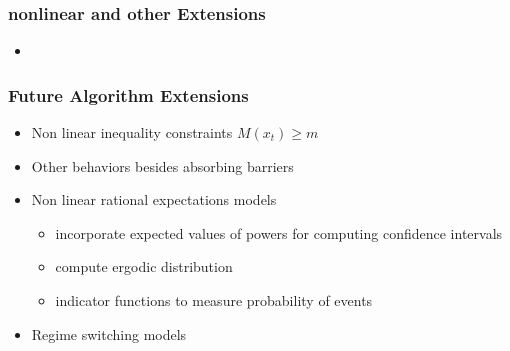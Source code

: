 \documentclass{beamer}
\begin{document}
  \begin{frame}
    \frametitle{nonlinear and other Extensions}
    \begin{itemize}
    \item 
    \end{itemize}
  \end{frame}

   \begin{frame}
     \frametitle{Future Algorithm Extensions}
     \begin{itemize}
     \item  Non linear inequality constraints $M(x_t) \ge m $
     \item Other behaviors besides absorbing barriers
\item Non linear rational expectations models
  \begin{itemize}
\item incorporate expected values of powers for computing confidence intervals 
\item compute ergodic distribution
\item indicator functions to measure probability of events
  \end{itemize}
\item Regime switching models
     \end{itemize}
   \end{frame}
\end{document}
